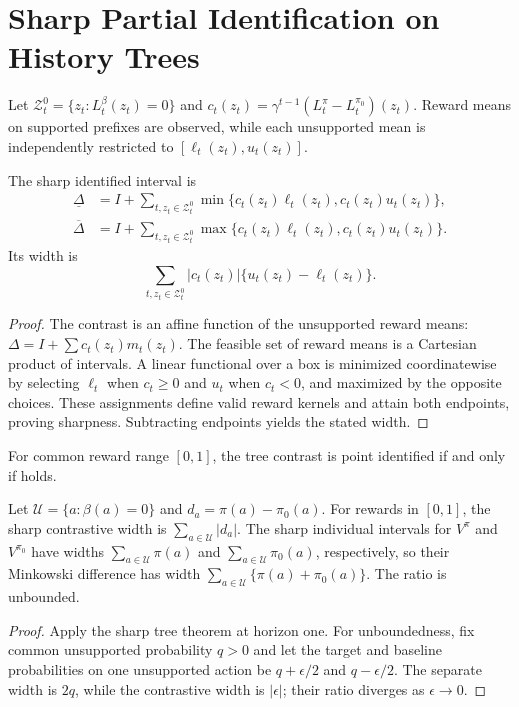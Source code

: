 \section{Sharp Partial Identification on History Trees}

Let $\mathcal Z_t^0=\{z_t:L_t^\beta(z_t)=0\}$ and
$c_t(z_t)=\gamma^{t-1}(L_t^\pi-L_t^{\pi_0})(z_t)$. Reward means on supported prefixes are observed, while each unsupported mean is independently restricted to $[\ell_t(z_t),u_t(z_t)]$.

\begin{theorem}[Restated]
The sharp identified interval is
\begin{align*}
\underline\Delta&=I+\sum_{t,z_t\in\mathcal Z_t^0}
\min\{c_t(z_t)\ell_t(z_t),c_t(z_t)u_t(z_t)\},\\
\overline\Delta&=I+\sum_{t,z_t\in\mathcal Z_t^0}
\max\{c_t(z_t)\ell_t(z_t),c_t(z_t)u_t(z_t)\}.
\end{align*}
Its width is
\[
\sum_{t,z_t\in\mathcal Z_t^0}|c_t(z_t)|
\{u_t(z_t)-\ell_t(z_t)\}.
\]
\end{theorem}

\begin{proof}
The contrast is an affine function of the unsupported reward means:
$\Delta=I+\sum c_t(z_t)m_t(z_t)$. The feasible set of reward means is a Cartesian product of intervals. A linear functional over a box is minimized coordinatewise by selecting $\ell_t$ when $c_t\ge0$ and $u_t$ when $c_t<0$, and maximized by the opposite choices. These assignments define valid reward kernels and attain both endpoints, proving sharpness. Subtracting endpoints yields the stated width.
\end{proof}

\begin{corollary}
For common reward range $[0,1]$, the tree contrast is point identified if and only if \UCC holds.
\end{corollary}

\begin{corollary}
Let $\mathcal U=\{a:\beta(a)=0\}$ and $d_a=\pi(a)-\pi_0(a)$.
For rewards in $[0,1]$, the sharp contrastive width is
$\sum_{a\in\mathcal U}|d_a|$.
The sharp individual intervals for $V^\pi$ and $V^{\pi_0}$ have widths
$\sum_{a\in\mathcal U}\pi(a)$ and
$\sum_{a\in\mathcal U}\pi_0(a)$, respectively, so their Minkowski difference has width
$\sum_{a\in\mathcal U}\{\pi(a)+\pi_0(a)\}$.
The ratio is unbounded.
\end{corollary}
\begin{proof}
Apply the sharp tree theorem at horizon one. For unboundedness, fix common unsupported probability $q>0$ and let the target and baseline probabilities on one unsupported action be $q+\epsilon/2$ and $q-\epsilon/2$. The separate width is $2q$, while the contrastive width is $|\epsilon|$; their ratio diverges as $\epsilon\to0$.
\end{proof}

